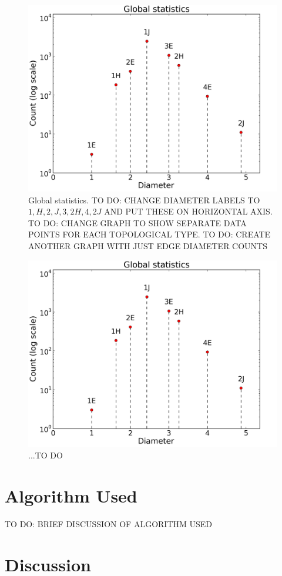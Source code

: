 \documentclass[12pt]{article}
\begin{document}
\begin{figure}
    \begin{center}
    \includegraphics[width=0.6\linewidth]{figures/global_statistics.png}
    \caption{Global statistics. TO DO: CHANGE DIAMETER LABELS TO $1, H, 2, J, 3, 2H, 4, 2J$ AND PUT THESE ON HORIZONTAL AXIS. TO DO: CHANGE GRAPH TO SHOW SEPARATE DATA POINTS FOR EACH TOPOLOGICAL TYPE. TO DO: CREATE ANOTHER GRAPH WITH JUST EDGE DIAMETER COUNTS}
    \end{center}
    \label{fig:global_statistics}
\end{figure}

\begin{figure}
    \begin{center}
    \includegraphics[width=0.6\linewidth]{figures/global_statistics.png}
    \caption{...TO DO}
    \end{center}
    \label{fig:global_statistics_edges}
\end{figure}

\section{Algorithm Used}

TO DO: BRIEF DISCUSSION OF ALGORITHM USED

\section{Discussion}
\end{document}
